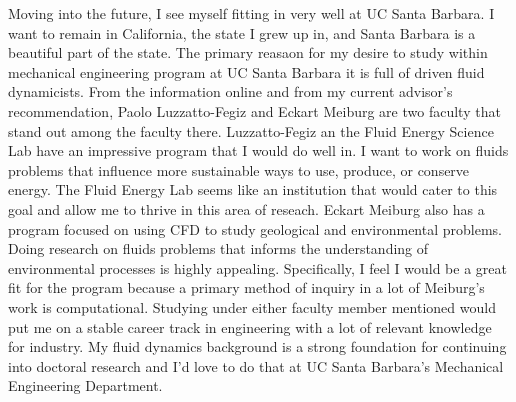 \documentclass{article}
\begin{document}
Moving into the future, I see myself fitting in very well at UC Santa Barbara. I want to remain in California, the state I grew up in, and Santa Barbara is a beautiful part of the state. The primary reasaon for my desire to study within mechanical engineering program at UC Santa Barbara it is full of driven fluid dynamicists. From the information online and from my current advisor's recommendation, Paolo Luzzatto-Fegiz and Eckart Meiburg are two faculty that stand out among the faculty there. Luzzatto-Fegiz an the Fluid Energy Science Lab have an impressive program that I would do well in. I want to work on fluids problems that influence more sustainable ways to use, produce, or conserve energy. The Fluid Energy Lab seems like an institution that would cater to this goal and allow me to thrive in this area of reseach. Eckart Meiburg also has a program focused on using CFD to study geological and environmental problems. Doing research on fluids problems that informs the understanding of environmental processes is highly appealing. Specifically, I feel I would be a great fit for the program because a primary method of inquiry in a lot of Meiburg's work is computational. Studying under either faculty member mentioned would put me on a stable career track in engineering with a lot of relevant knowledge for industry. My fluid dynamics background is a strong foundation for continuing into doctoral research and I'd love to do that at UC Santa Barbara's Mechanical Engineering Department. 

\end{document}
